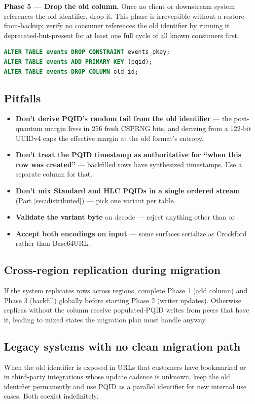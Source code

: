 \textbf{Phase 5 --- Drop the old column.} Once no client or downstream system references the old identifier, drop it. This phase is irreversible without a restore-from-backup; verify no consumer references the old identifier by running it deprecated-but-present for at least one full cycle of all known consumers first.

\begin{lstlisting}[language=SQL,caption={Dropping the old identifier column}]
ALTER TABLE events DROP CONSTRAINT events_pkey;
ALTER TABLE events ADD PRIMARY KEY (pqid);
ALTER TABLE events DROP COLUMN old_id;
\end{lstlisting}

\subsection{Pitfalls}

\begin{itemize}
  \item \textbf{Don't derive PQID's random tail from the old identifier} --- the post-quantum margin lives in 256 fresh CSPRNG bits, and deriving from a 122-bit UUIDv4 caps the effective margin at the old format's entropy.
  \item \textbf{Don't treat the PQID timestamp as authoritative for ``when this row was created''} --- backfilled rows have synthesized timestamps. Use a separate  column for that.
  \item \textbf{Don't mix Standard and HLC PQIDs in a single ordered stream} (Part \ref{sec:distributed}) --- pick one variant per table.
  \item \textbf{Validate the variant byte} on decode --- reject anything other than  or .
  \item \textbf{Accept both encodings on input} --- some surfaces serialize as Crockford rather than Base64URL.
\end{itemize}

\subsection{Cross-region replication during migration}

If the system replicates rows across regions, complete Phase 1 (add column) and Phase 3 (backfill) globally before starting Phase 2 (writer updates). Otherwise replicas without the column receive populated-PQID writes from peers that have it, leading to mixed states the migration plan must handle anyway.

\subsection{Legacy systems with no clean migration path}

When the old identifier is exposed in URLs that customers have bookmarked or in third-party integrations whose update cadence is unknown, keep the old identifier permanently and use PQID as a parallel identifier for new internal use cases. Both coexist indefinitely.
